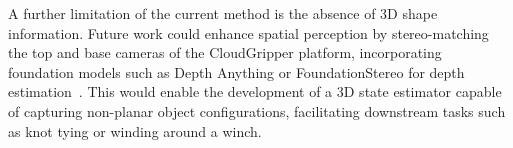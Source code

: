 \documentclass[letterpaper, 10 pt, conference]{IEEETran}
\begin{document}
A further limitation of the current method is the absence of 3D shape information. Future work could enhance spatial perception by stereo-matching the top and base cameras of the CloudGripper platform, incorporating foundation models such as Depth Anything or FoundationStereo for depth estimation~\cite{yang2024depth_anything_v1, yang2024depth_anything_v2, wen2025foundationstereo}. This would enable the development of a 3D state estimator capable of capturing non-planar object configurations, facilitating downstream tasks such as knot tying or winding around a winch.





\end{document}
